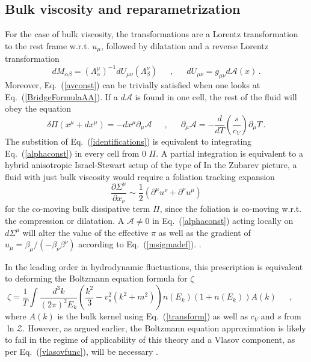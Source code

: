 \documentclass[12pt,onecolumn,showpacs,amssymb,aps,nofootinbib,floatfix]{revtex4-2}
\renewcommand{\eqref}[1]{Eq.~(\ref{#1})}
\newcommand{\eqcomma}{\phantom{AA},\phantom{AA}}
\newcommand{\lnz}{\ln \mathcal{Z}}
\begin{document}
	\subsection{Bulk viscosity and reparametrization \label{bulkrep}}
	For the case of bulk viscosity, the transformations are a Lorentz transformation to the rest frame w.r.t. $u_\mu$, followed by dilatation and a reverse Lorentz transformation
	\begin{equation}
		\label{transform}
		dM_{\alpha \beta} = (\Lambda_{\alpha}^\mu)^{-1} dU_{\mu \nu} (\Lambda_{\beta}^\nu) \eqcomma dU_{\mu \nu} = g_{\mu \nu} d\mathcal{A}(x)\,.
	\end{equation}
	Moreover, \eqref{avconst} can be trivially satisfied when one looks at \eqref{BridgeFormulaAA}. If a $d\mathcal{A}$ is found in one cell, the rest of the fluid will obey the equation
	\begin{equation}
		\label{alphaconst}
		\delta\Pi(x^\mu + dx^\mu) = -dx^\mu \partial_\mu \mathcal{A} \eqcomma
		\partial_\mu \mathcal{A} =  -\frac{d}{dT} \left(\frac{s}{c_V} \right) \partial_\mu T\,.
	\end{equation}
        \color{black}The substition of \eqref{identifications} is equivalent to integrating \eqref{alphaconst} in every cell from 0 $\Pi$.   A partial integration is equivalent to a hybrid anisotropic Israel-Stewart setup of the type of \cite{spal}
        In the Zubarev picture, a fluid with just bulk viscosity would require a foliation tracking expansion
        \begin{equation}
\frac{\partial \Sigma^\mu}{\partial x_{\nu}} \sim \frac{1}{2} \left(\partial^\mu u^\nu + \partial^\nu u^\mu \right)
        \end{equation}
        for the co-moving bulk dissipative term $\Pi$, since the foliation is co-moving w.r.t. the compression or dilatation.   A $\mathcal{A}\ne 0$ in \eqref{alphaconst} acting locally on $d\Sigma^\mu$ will alter the value of the effective $\pi$ as well as the gradient of $u_\mu=\beta_\mu/(-\beta_\nu \beta^\nu)$ according to \eqref{msigmadef}.
        \color{black}.
        
	In the leading order in hydrodynamic fluctuations, this prescription is equivalent to deforming the Boltzmann equation formula for $\zeta$  \cite{jeonb}
	\begin{equation}
		\label{bulkjeon}
		\zeta=\frac{1}{T}\int \frac{d^3 k}{(2\pi)^2 E_k} \left( \frac{k^2}{3}-v_s^2 (k^2+m^2) \right) n(E_k)\left(1+n(E_k)\right)A(k) \eqcomma 
	\end{equation}
	where $A(k)$ is the bulk kernel using \eqref{transform} as well as $c_V$ and $s$ from $\lnz$.  However, as argued earlier, the Boltzmann equation approximation is likely to fail in the regime of applicability of this theory \color{black} and a Vlasov component, as per \eqref{vlasovfunc}, will be necessary \color{black}.
		
\end{document}
